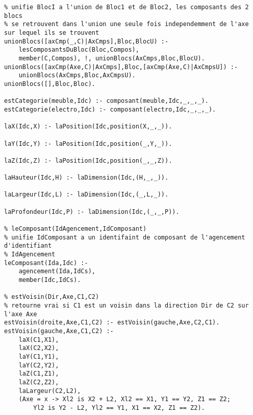 \documentclass[letterpaper,11pt]{letter}
\begin{document}
\begin{Verbatim}[commandchars=\\\{\}]
% unionBlocs(Bloc1,Bloc2,BlocU)
% unifie BlocI a l'union de Bloc1 et de Bloc2, les composants des 2 blocs
% se retrouvent dans l'union une seule fois independemment de l'axe sur lequel ils se trouvent
unionBlocs([axCmp(_,C)|AxCmps],Bloc,BlocU) :-
	lesComposantsDuBloc(Bloc,Compos),
	member(C,Compos), !, unionBlocs(AxCmps,Bloc,BlocU).
unionBlocs([axCmp(Axe,C)|AxCmps],Bloc,[axCmp(Axe,C)|AxCmpsU]) :-
	unionBlocs(AxCmps,Bloc,AxCmpsU).
unionBlocs([],Bloc,Bloc).

estCategorie(meuble,Idc) :- composant(meuble,Idc,_,_,_).
estCategorie(electro,Idc) :- composant(electro,Idc,_,_,_).

laX(Idc,X) :- laPosition(Idc,position(X,_,_)).

laY(Idc,Y) :- laPosition(Idc,position(_,Y,_)).

laZ(Idc,Z) :- laPosition(Idc,position(_,_,Z)).

laHauteur(Idc,H) :- laDimension(Idc,(H,_,_)).

laLargeur(Idc,L) :- laDimension(Idc,(_,L,_)).

laProfondeur(Idc,P) :- laDimension(Idc,(_,_,P)).

% leComposant(IdAgencement,IdComposant)
% unifie IdComposant a un identifaint de composant de l'agencement d'identifiant
% IdAgencement
leComposant(Ida,Idc) :-
	agencement(Ida,IdCs),
	member(Idc,IdCs).

% estVoisin(Dir,Axe,C1,C2)
% retourne vrai si C1 est un voisin dans la direction Dir de C2 sur l'axe Axe
estVoisin(droite,Axe,C1,C2) :- estVoisin(gauche,Axe,C2,C1).
estVoisin(gauche,Axe,C1,C2) :-
	laX(C1,X1),
	laX(C2,X2),
	laY(C1,Y1),
	laY(C2,Y2),
	laZ(C1,Z1),
	laZ(C2,Z2),
	laLargeur(C2,L2),
	(Axe = x -> Xl2 is X2 + L2, Xl2 == X1, Y1 == Y2, Z1 == Z2;
	    Yl2 is Y2 - L2, Yl2 == Y1, X1 == X2, Z1 == Z2).
\end{Verbatim}
\newpage
\end{document}

